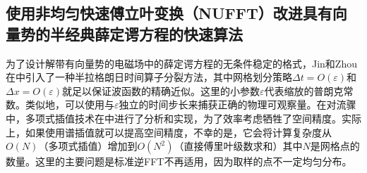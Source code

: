 \subsection{使用非均匀快速傅立叶变换（NUFFT）改进具有向量势的半经典薛定谔方程的快速算法}


为了设计解带有向量势的电磁场中的薛定谔方程的无条件稳定的格式，Jin和Zhou在中引入了一种半拉格朗日时间算子分裂方法，其中网格划分策略$\Delta t=O(\varepsilon)$和$\Delta x=O(\varepsilon)$就足以保证波函数的精确近似。这里的小参数$\varepsilon $代表缩放的普朗克常数。类似地，可以使用与$\varepsilon $独立的时间步长来捕获正确的物理可观察量。在对流骤中，多项式插值技术在中进行了分析和实现，为了效率考虑牺牲了空间精度。实际上，如果使用谱插值就可以提高空间精度，不幸的是，它会将计算复杂度从$O(N)$（多项式插值）增加到$O(N^2)$（直接傅里叶级数求和）其中$N$是网格点的数量。这里的主要问题是标准逆FFT不再适用，因为取样的点不一定均匀分布。

